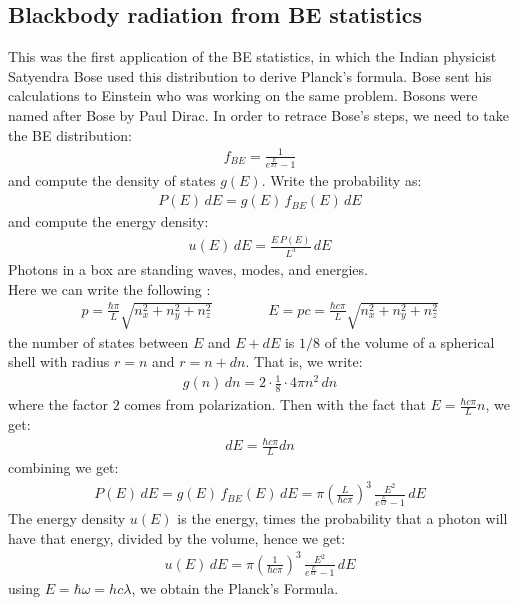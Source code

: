 \documentclass[11pt]{article}
\theoremstyle{break}
\theoremstyle{break}
\begin{document}
\subsection{Blackbody radiation from BE statistics}
This was the first application of the BE statistics, in which the Indian 
physicist Satyendra Bose used this distribution to derive Planck's formula. Bose sent his calculations to Einstein who was working on the same problem. Bosons were named after Bose by Paul Dirac. In order to retrace Bose's steps, we need to take the BE distribution:
\begin{align*}
f_{BE} = \frac{1}{e^{\frac{E}{kT}}-1}
\end{align*}
and compute the density of states $g(E)$. Write the probability as:
\begin{align*}
P(E) \, dE = g(E)\, f_{BE}(E)\, dE
\end{align*}
and compute the energy density:
\begin{align*}
u(E) \, dE = \frac{E\,P(E)}{L^3}\, dE
\end{align*}
Photons in a box are standing waves, modes, and energies. \\
Here we can write the following :
\begin{align*}
p= \frac{\hbar \pi}{L}\sqrt{n_x^2+n_y^2 + n_z^2} \qquad\qquad E = pc = \frac{\hbar c\pi}{L}\sqrt{n_x^2 + n_y^2 + n_z^2}
\end{align*}
the number of states between $E$ and $E + dE$ is $1/8$ of the volume of a spherical shell with radius $r = n$ and $r=n+dn$. That is, we write:
\begin{align*}
g(n) \, dn = 2 \cdot \frac{1}{8}\cdot 4\pi n^2 \, dn
\end{align*}
where the factor $2$ comes from polarization. Then with the fact that $E = \frac{\hbar c\pi}{L}n$, we get:
\begin{align*}
dE = \frac{\hbar c\pi}{L} dn
\end{align*}
combining we get:
\begin{align*}
P(E) \, dE = g(E) \, f_{BE}(E)\, dE = \pi \left( \frac{L}{\hbar c\pi}\right)^3 \, \frac{E^2}{e^{\frac{E}{kT}}-1}\, dE
\end{align*}
The energy density $u(E)$ is the energy, times the probability that a 
photon will have that energy, divided by the volume, hence we get:
\begin{align*}
u(E) \, dE =  \pi \left( \frac{1}{\hbar c\pi}\right)^3 \, \frac{E^2}{e^{\frac{E}{kT}}-1}\, dE
\end{align*}
using $E = \hbar \omega = hc\lambda$, we obtain the Planck's Formula. \\
\end{document}
